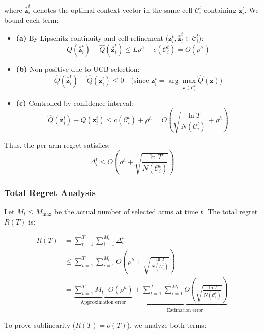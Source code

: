 where $\overset{*}{\mathbf{z}}_i^t$ denotes the optimal context vector in the same cell $\mathcal{C}_i^t$ containing $\mathbf{z}_i^t$. We bound each term:

\begin{itemize}
\item \textbf{(a)} By Lipschitz continuity and cell refinement ($\mathbf{z}_i^t, \overset{*}{\mathbf{z}}_i^t \in \mathcal{C}_i^t$):
\[
Q(\overset{*}{\mathbf{z}}_i^t) - \hat{Q}(\overset{*}{\mathbf{z}}_i^t) \leq L\rho^{h} + c(\mathcal{C}_i^t) = O(\rho^{h})
\]

\item \textbf{(b)} Non-positive due to UCB selection:
\[
\hat{Q}(\overset{*}{\mathbf{z}}_i^t) - \hat{Q}(\mathbf{z}_i^t) \leq 0 \quad \text{(since } \mathbf{z}_i^t = \arg\max_{\mathbf{z} \in \mathcal{C}_i^t} \hat{Q}(\mathbf{z}))
\]

\item \textbf{(c)} Controlled by confidence interval:
\[
\hat{Q}(\mathbf{z}_i^t) - Q(\mathbf{z}_i^t) \leq c(\mathcal{C}_i^t) + \rho^h = O\left(\sqrt{\frac{\ln T}{N(\mathcal{C}_i^t)}} + \rho^h\right)
\]
\end{itemize}

\noindent Thus, the per-arm regret satisfies:
\begin{equation}
\Delta_i^t \leq O\left(\rho^h + \sqrt{\frac{\ln T}{N(\mathcal{C}_i^t)}}\right) \label{eq:per_arm_bound}
\end{equation}

\subsubsection{Total Regret Analysis}
Let $M_t \leq M_{\text{max}}$ be the actual number of selected arms at time $t$. The total regret $R(T)$ is:

\begin{align}
R(T) &= \sum_{t=1}^T \sum_{i=1}^{M_t} \Delta_i^t \nonumber \\
     &\leq \sum_{t=1}^T \sum_{i=1}^{M_t} O\left(\rho^h + \sqrt{\frac{\ln T}{N(\mathcal{C}_i^t)}}\right) \nonumber \\
     &= \underbrace{\sum_{t=1}^T M_t \cdot O(\rho^h)}_{\text{Approximation error}} + \underbrace{\sum_{t=1}^T \sum_{i=1}^{M_t} O\left(\sqrt{\frac{\ln T}{N(\mathcal{C}_i^t)}}\right)}_{\text{Estimation error}} \label{eq:total_regret}
\end{align}

\noindent To prove sublinearity ($R(T) = o(T)$), we analyze both terms:

